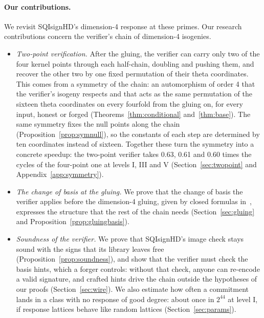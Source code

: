 \documentclass[version=preprint]{iacrcc}
\begin{document}
    \paragraph{Our contributions.}
    We revisit SQIsignHD's dimension-4 response at these primes. Our research
    contributions concern the verifier's chain of dimension-4 isogenies.
    \begin{itemize}
        \item \emph{Two-point verification.} After the gluing, the verifier
        can carry only two of the four kernel points through each half-chain,
        doubling and pushing them, and recover the other two by one fixed
        permutation of their theta coordinates. This comes from a symmetry of
        the chain: an automorphism of order 4 that the verifier's isogeny
        respects and that acts as the same permutation of the sixteen theta
        coordinates on every fourfold from the gluing on, for every input,
        honest or forged (Theorems~\ref{thm:conditional}
        and~\ref{thm:base}). The same symmetry fixes the null points along the
        chain (Proposition~\ref{prop:symnull}), so the constants of each step
        are determined by ten coordinates instead of sixteen. Together these
        turn the symmetry into a concrete speedup: the two-point verifier takes
        0.63, 0.61 and 0.60 times the cycles of the four-point one at levels I,
        III and V (Section~\ref{sec:twopoint} and
        Appendix~\ref{app:symmetry}).
        \item \emph{The change of basis at the gluing.} We prove that the
        change of basis the verifier applies before the dimension-4 gluing,
        given by closed formulas in~\cite{Dar24}, expresses the structure that
        the rest of the chain needs (Section~\ref{sec:gluing} and
        Proposition~\ref{prop:gluingbasis}).
        \item \emph{Soundness of the verifier.} We prove that SQIsignHD's
        image check stays sound with the signs that its library leaves free
        (Proposition~\ref{prop:soundness}), and show that the verifier must
        check the basis hints, which a forger controls: without that check,
        anyone can re-encode a valid signature, and crafted hints drive the
        chain outside the hypotheses of our proofs (Section~\ref{sec:wire}). We
        also estimate how often a commitment lands in a class with no response
        of good degree: about once in $2^{44}$ at level I, if response lattices
        behave like random lattices (Section~\ref{sec:params}).
    \end{itemize}
\end{document}
